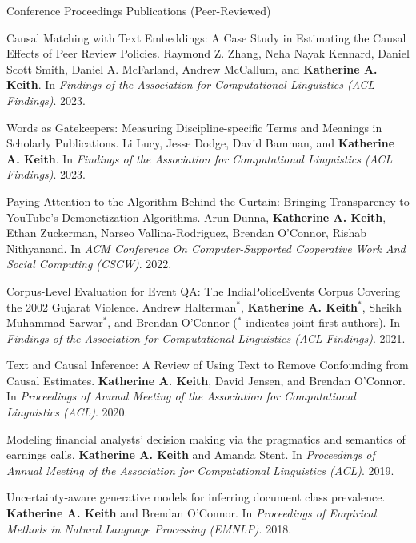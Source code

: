 \documentclass{resume} %
\begin{document}
\begin{rSection}{Conference Proceedings Publications (Peer-Reviewed)}
\begin{etaremune}

\item Causal Matching with Text Embeddings: A Case Study in Estimating the Causal Effects of Peer Review Policies.
    Raymond Z. Zhang, Neha Nayak Kennard, 
    Daniel Scott Smith, Daniel A. McFarland, 
    Andrew McCallum, and \textbf{Katherine A. Keith}.
    In \emph{Findings of the Association for Computational Linguistics (ACL Findings)}. 2023.

\item Words as Gatekeepers: Measuring Discipline-specific
    Terms and Meanings in Scholarly Publications.
    Li Lucy, Jesse Dodge, David Bamman, and \textbf{Katherine A. Keith}.
    In \emph{Findings of the Association for Computational Linguistics (ACL Findings)}. 2023.

\item Paying Attention to the Algorithm Behind the Curtain: Bringing Transparency to YouTube's Demonetization Algorithms.
    Arun Dunna, \textbf{Katherine A. Keith}, Ethan Zuckerman, Narseo Vallina-Rodriguez, Brendan O'Connor, Rishab Nithyanand. 
    In \emph{ACM Conference On Computer-Supported Cooperative Work And Social Computing (CSCW)}. 2022. 

\item Corpus-Level Evaluation for Event QA: The IndiaPoliceEvents Corpus Covering the 2002 Gujarat Violence. Andrew Halterman$^*$, \textbf{Katherine A. Keith}$^*$, Sheikh Muhammad Sarwar$^*$, and Brendan O'Connor ($^*$ indicates joint first-authors).  In \emph{Findings of the Association for Computational Linguistics (ACL Findings)}. 2021.

\item Text and Causal Inference: A Review of Using Text to Remove Confounding from Causal Estimates. \textbf{Katherine A. Keith}, David Jensen, and Brendan O'Connor. In \emph{Proceedings of Annual Meeting of the Association for Computational Linguistics (ACL)}. 2020.  

\item Modeling financial analysts' decision making via the pragmatics and semantics of earnings calls. 
\textbf{Katherine A. Keith} and Amanda Stent. 
In \emph{Proceedings of Annual Meeting of the Association for Computational Linguistics (ACL)}.  2019. 

\item Uncertainty-aware generative models for inferring document class prevalence.
\textbf{Katherine A. Keith} and Brendan O'Connor. 
In \emph{Proceedings of Empirical Methods in Natural Language Processing (EMNLP)}. 2018. 


\end{etaremune}
\end{rSection}
\end{document}
